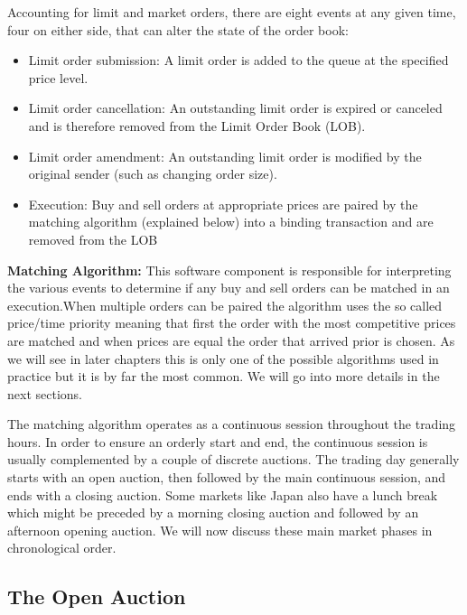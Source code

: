 Accounting for limit and market orders, there are eight events at any given time, four on either side, that can alter the state of the order book:
	\begin{itemize}
	\item Limit order submission: A limit order is added to the queue at the specified price level.
	\item Limit order cancellation: An outstanding limit order is expired or canceled and is therefore removed from the Limit Order Book (LOB).
	\item Limit order amendment: An outstanding limit order is modified by the original sender (such as changing order size).
	\item Execution: Buy and sell orders at appropriate prices are paired by the matching algorithm (explained below) into a binding transaction and are removed from the LOB
	\end{itemize}


\noindent\textbf{Matching Algorithm:} This software component is responsible for interpreting the various events to determine if any buy and sell orders can be matched in an execution.When multiple orders can be paired the algorithm uses the so called price/time priority meaning that first the order with the most competitive prices are matched and when prices are equal the order that arrived prior is chosen. As we will see in later chapters this is only one of the possible algorithms used in practice but it is by far the most common. We will go into more details in the next sections.


The matching algorithm operates as a continuous session throughout the trading hours. In order to ensure an orderly start and end, the continuous session is usually complemented by a couple of discrete auctions. The trading day generally starts with an open auction, then followed by the main continuous session, and ends with a closing auction. Some markets like Japan also have a lunch break which might be preceded by a morning closing auction and followed by an afternoon opening auction. We will now discuss these main market phases in chronological order. \twomedskip



\subsection{The Open Auction} 

